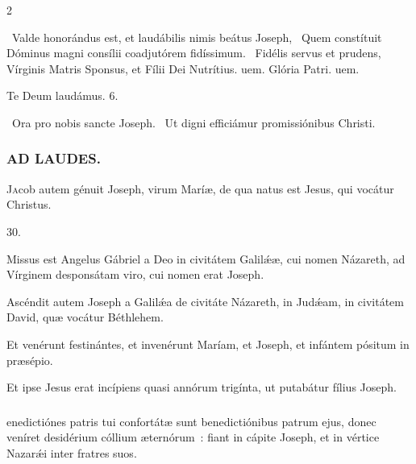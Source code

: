 \documentclass[9pt,twoside]{extarticle}
\begin{document}
\begin{multicols}{2}
{\begin{tightlist}{}
\item {}~Valde honorándus est, et laudábilis nimis beátus Joseph, \textred{*}~Quem constítuit Dóminus magni consílii coadjutórem fidíssimum. ~Fidélis servus et prudens, Vírginis Matris Sponsus, et Fílii Dei Nutrítius. uem. Glória Patri. uem.
\item Te Deum laudámus. 6.
\item {}~Ora pro nobis sancte Joseph. ~Ut digni efficiámur promissiónibus Christi.
\end{tightlist}

\subsubsection*{\center \textsc{AD LAUDES.}}
\begin{center}\end{center}
\lettrine{J}acob autem génuit Joseph, virum Maríæ, de qua natus est Jesus, qui vocátur Christus.

\begin{tightlist}{}
\item {} 30.
\item {} Missus est Angelus Gábriel a Deo in civitátem Galilǽæ, cui nomen Názareth, ad Vírginem desponsátam viro, cui nomen erat Joseph.
\item {} Ascéndit autem Joseph a Galilǽa de civitáte Názareth, in Judǽam, in civitátem David, quæ vocátur Béthlehem.
\item {} Et venérunt festinántes, et invenérunt Maríam, et Joseph, et infántem pósitum in præsépio.
\item {} Et ipse Jesus erat incípiens quasi annórum trigínta, ut putabátur fílius Joseph.
\end{tightlist}

\subsubsection*{}
enedictiónes patris tui confortátæ sunt benedictiónibus patrum ejus, donec veníret desidérium cóllium æternórum~: fiant in cápite Joseph, et in vértice Nazarǽi inter fratres suos.

}
\end{multicols}
\end{document}
